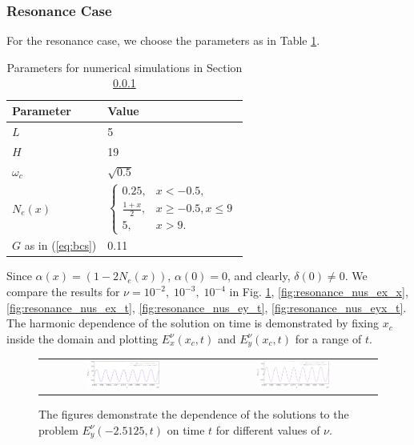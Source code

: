 \subsubsection{Resonance Case}
\label{sec:resn}
For the resonance case, we choose the parameters as in Table \ref{tab:parameters_resonance}.
\begin{table}[htb!]
\begin{tabular}{l|l}
Parameter & Value \\
\hline
$L$ & 5\\
$H$ & 19\\
$\omega_c$ &  $\sqrt{0.5}$\\
$N_e(x)$ &  $\left\{
 \begin{array}{lr}
  0.25, & x<-0.5,\\
  \frac{1+x}{2}, & x\geq -0.5, x\leq 9\\
  5, & x>9.
 \end{array}\right.$\\
 $G$ as in (\ref{eq:bcs}) & 0.11 \\
\end{tabular}
\caption{Parameters for numerical simulations in Section \ref{sec:resn}}
\label{tab:parameters_resonance}
\end{table}
Since $\alpha(x)=(1-2N_e(x))$, $\alpha(0)=0$, and clearly, $\delta(0)\neq 0$. We compare the results for $\nu=10^{-2},\; 10^{-3},\; 10^{-4}$ in Fig. \ref{fig:resonance_nus_ey_x}, 
\ref{fig:resonance_nus_ex_x}, \ref{fig:resonance_nus_ex_t}, \ref{fig:resonance_nus_ey_t}, \ref{fig:resonance_nus_eyx_t}. 
The harmonic dependence of the solution on time is demonstrated by fixing $x_c$ inside the domain and plotting 
$E_x^{\nu}(x_c,t)$ and $E_y^{\nu}(x_c, t)$ for a range of $t$. 
\begin{figure}
\begin{tabular}{cc}
\includegraphics[width=0.45\textwidth]{pics_time_domain/res/ey_fixed_x-crop.pdf}&
\includegraphics[width=0.45\textwidth]{pics_time_domain/res/ey_fixed_x_1e3-crop.pdf}
 \end{tabular}
\caption{The figures demonstrate the dependence of the solutions to the problem 
$E_y^{\nu}(-2.5125,t)$ on time $t$ for different values of $\nu$. }
\label{fig:resonance_nus_ey_x}
\end{figure}
